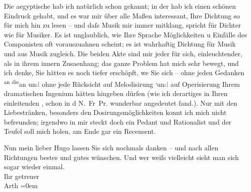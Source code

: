 \pstart
           Die aegyptische hab ich
               natürlich schon gekannt; in der \label{K_L02504-1v}\label{K_L02504-1} hab
               ich einen schönen Eindruck gehabt, und es war mir über alle Maßen interessant, Ihre
               Dichtung so für mich hin zu lesen – und daſs Musik mir immer mitklang, spricht für
               Dichter wie für Musiker. Es ist unglaublich, wie Ihre Sprache Möglichkeiten u
               Einfälle des Componisten oft vorauszuahnen scheint; es ist wahrhaftig Dichtung für
               Musik und aus Musik zugleich. Die beiden Akte sind mir {\pb}jeder für sich, einleuchtender, als in ihrem innern Zusa{\geminationm}enhang; das ganze Problem hat mich sehr bewegt, und ich
               denke, Sie hätten es noch tiefer erschöpft, we{\geminationn} Sie sich
               – ohne jeden Gedanken \substVorne{}\textsuperscript{an die}\substDazwischen{}an\substHinten{} un\textcolor{gray}{d} ohne jede Rücksicht auf Melodisirung \substVorne{}\textsuperscript{,}\substDazwischen{}un\textcolor{gray}{d}\substHinten{} auf Operisierung Ihrem dramatischen Ingenium hätten hingeben dürfen (wie ich
               derartiges in Ihren einleitenden \label{K_L02504-2v}\label{K_L02504-2}, schon in d N. Fr Pr. wunderbar angedeutet fand.). Nur mit den
               Liebestränken, besonders den Dosirungsmöglichkeiten konnt ich mich nicht befreunden;
               irgendwo in mir steckt doch ein Pedant und Rationalist und der Teufel soll mich
               holen, am Ende gar ein Recensent.\pend
           
\pstart
           Nun mein lieber Hugo lassen Sie sich nochmals danken – und nach allen Richtungen
               bestes und gutes wünschen. Und wer weiſs vielleicht sieht man sich sogar wieder
               einmal.{\\[\baselineskip]}Ihr getreuer{\\[\baselineskip]}\spacefill\mbox{Arth}\pend
           \leftskip=0em{}\endnumbering{}  
      
